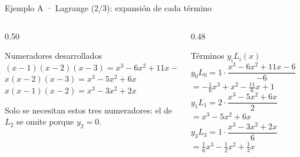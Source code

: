 \documentclass[aspectratio=169,10pt]{beamer}
\begin{document}
\begin{frame}{Ejemplo A · Lagrange (2/3): expansión de cada término}
\begin{columns}[T]
\begin{column}{0.50\textwidth}
\begin{cardgear}{Numeradores desarrollados}{\faCalculator}
{\footnotesize
$(x{-}1)(x{-}2)(x{-}3)=x^3-6x^2+11x-6$\\[1.0mm]
$x(x{-}2)(x{-}3)=x^3-5x^2+6x$\\[1.0mm]
$x(x{-}1)(x{-}2)=x^3-3x^2+2x$}
\end{cardgear}
\vspace{1mm}
\begin{cardnota}[\faInfoCircle]
{\footnotesize Solo se necesitan estos tres numeradores: el de $L_2$ se omite porque $y_2=0$.}
\end{cardnota}
\end{column}
\begin{column}{0.48\textwidth}
\begin{cardidea}{Términos $y_iL_i(x)$}{\faSuperscript}
{\footnotesize
$y_0L_0=1\cdot\dfrac{x^3-6x^2+11x-6}{-6}$\\[0.4mm]
\hspace{6mm}$=-\tfrac16x^3+x^2-\tfrac{11}{6}x+1$\\[1.4mm]
$y_1L_1=2\cdot\dfrac{x^3-5x^2+6x}{2}$\\[0.4mm]
\hspace{6mm}$=x^3-5x^2+6x$\\[1.4mm]
$y_3L_3=1\cdot\dfrac{x^3-3x^2+2x}{6}$\\[0.4mm]
\hspace{6mm}$=\tfrac16x^3-\tfrac12x^2+\tfrac13x$}
\end{cardidea}
\end{column}
\end{columns}
\end{frame}
\end{document}
